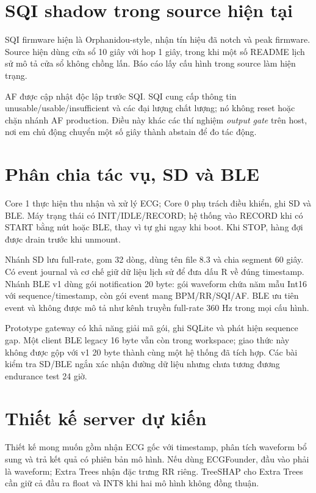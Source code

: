 \documentclass[12pt,a4paper,oneside]{report}
\begin{document}
\section{SQI shadow trong source hiện tại}
SQI firmware hiện là Orphanidou-style, nhận tín hiệu đã notch và peak firmware. Source hiện dùng cửa sổ 10 giây với hop 1 giây, trong khi một số README lịch sử mô tả cửa sổ không chồng lấn. Báo cáo lấy cấu hình trong source làm hiện trạng.

AF được cập nhật độc lập trước SQI. SQI cung cấp thông tin unusable/usable/insufficient và các đại lượng chất lượng; nó không reset hoặc chặn nhánh AF production. Điều này khác các thí nghiệm \emph{output gate} trên host, nơi em chủ động chuyển một số giây thành abstain để đo tác động.

\section{Phân chia tác vụ, SD và BLE}
Core 1 thực hiện thu nhận và xử lý ECG; Core 0 phụ trách điều khiển, ghi SD và BLE. Máy trạng thái có INIT/IDLE/RECORD; hệ thống vào RECORD khi có START bằng nút hoặc BLE, thay vì tự ghi ngay khi boot. Khi STOP, hàng đợi được drain trước khi unmount.

Nhánh SD lưu full-rate, gom 32 dòng, dùng tên file 8.3 và chia segment 60 giây. Có event journal và cơ chế giữ dữ liệu lịch sử để đưa dấu R về đúng timestamp. Nhánh BLE v1 dùng gói notification 20 byte: gói waveform chứa năm mẫu Int16 với sequence/timestamp, còn gói event mang BPM/RR/SQI/AF. BLE ưu tiên event và không được mô tả như kênh truyền full-rate 360 Hz trong mọi cấu hình.

Prototype gateway có khả năng giải mã gói, ghi SQLite và phát hiện sequence gap. Một client BLE legacy 16 byte vẫn còn trong workspace; giao thức này không được gộp với v1 20 byte thành cùng một hệ thống đã tích hợp. Các bài kiểm tra SD/BLE ngắn xác nhận đường dữ liệu nhưng chưa tương đương endurance test 24 giờ.

\section{Thiết kế server dự kiến}
Thiết kế mong muốn gồm nhận ECG gốc với timestamp, phân tích waveform bổ sung và trả kết quả có phiên bản mô hình. Nếu dùng ECGFounder, đầu vào phải là waveform; Extra Trees nhận đặc trưng RR riêng. TreeSHAP cho Extra Trees cần giữ cả đầu ra float và INT8 khi hai mô hình không đồng thuận.
\end{document}
